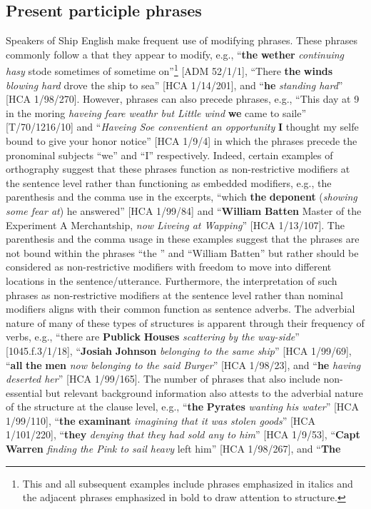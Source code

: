 \subsection{{Present participle phrases} }\label{sec:5.5.2}

Speakers of Ship English make frequent use of modifying  phrases. These  phrases commonly follow a  that they appear to modify, e.g., “\textbf{the} \textbf{wether} \textit{continuing hasy} stode sometimes of sometime on”\footnote{This and all subsequent examples include  phrases emphasized in italics and the adjacent  phrases emphasized in bold to draw attention to structure.} [ADM 52/1/1], “There \textbf{the} \textbf{winds} \textit{blowing hard} drove the ship to sea” [HCA 1/14/201], and “\textbf{he} \textit{standing hard}” [HCA 1/98/270]. However,  phrases can also precede  phrases, e.g., “This day at 9 in the moring \textit{haveing feare weathr but Little wind} \textbf{we} came to saile” [T/70/1216/10] and “\textit{Haveing Soe conventient an opportunity} \textbf{I} thought my selfe bound to give your honor notice” [HCA 1/9/4] in which the  phrases precede the pronominal subjects “we” and “I” respectively. Indeed, certain examples of orthography suggest that these phrases function as non-restrictive modifiers at the sentence level rather than functioning as embedded   modifiers, e.g., the parenthesis and the comma use in the excerpts, “which \textbf{the} \textbf{deponent} (\textit{showing some fear at}) he answered” [HCA 1/99/84] and “\textbf{William} \textbf{Batten} Master of the Experiment A Merchantship, \textit{now Liveing at Wapping}” [HCA 1/13/107]. The parenthesis and the comma usage in these examples suggest that the phrases are not bound within the  phrases “the ” and “William Batten” but rather should be considered as non-restrictive modifiers with freedom to move into different locations in the sentence/utterance. Furthermore, the interpretation of such phrases as non-restrictive modifiers at the sentence level rather than nominal modifiers aligns with their common function as sentence adverbs. The adverbial nature of many of these types of structures is apparent through their frequency of  verbs, e.g., “there are \textbf{Publick} \textbf{Houses} \textit{scattering by the way-side}” [1045.f.3/1/18], “\textbf{Josiah} \textbf{Johnson} \textit{belonging to the same ship}” [HCA 1/99/69], “\textbf{all} \textbf{the} \textbf{men} \textit{now belonging to the said Burger}” [HCA 1/98/23], and “\textbf{he} \textit{having deserted her}” [HCA 1/99/165]. The number of phrases that also include non-essential but relevant background information also attests to the adverbial nature of the structure at the clause level, e.g., “\textbf{the} \textbf{Pyrates} \textit{wanting his water}” [HCA 1/99/110], “\textbf{the} \textbf{examinant} \textit{imagining that it was stolen goods}” [HCA 1/101/220], “\textbf{they} \textit{denying that they had sold any to him}” [HCA 1/9/53], “\textbf{Capt} \textbf{Warren} \textit{finding the Pink to sail heavy} left him” [HCA 1/98/267], and “\textbf{The} 